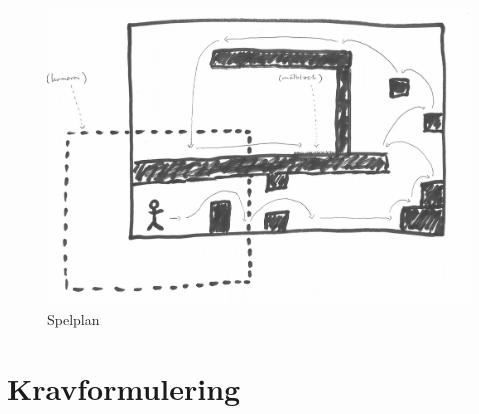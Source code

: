 \documentclass{TDP003mall}
\begin{document}
\begin{figure}[!h]
  \centering
  \includegraphics[scale=0.20]{spelplan}
  \caption{Spelplan}
  \label{Spelplan}
\end{figure}

\section{Kravformulering}
\end{document}
